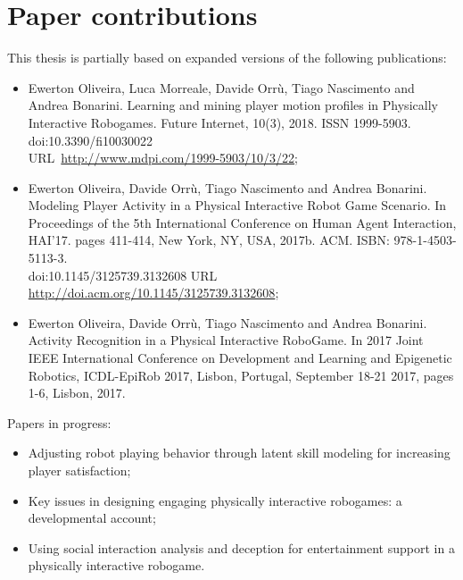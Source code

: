 \section{Paper contributions}

This thesis is partially based on expanded versions of the following publications:

\begin{itemize}
    \item Ewerton Oliveira, Luca Morreale, Davide Orrù, Tiago Nascimento and Andrea Bonarini. Learning and mining player motion profiles in Physically Interactive Robogames. Future Internet, 10(3), 2018. ISSN 1999-5903. doi:10.3390/fi10030022\\ URL~\url{http://www.mdpi.com/1999-5903/10/3/22};
    \item Ewerton Oliveira, Davide Orrù, Tiago Nascimento and Andrea Bonarini. Modeling Player Activity  in a Physical Interactive Robot Game Scenario. In Proceedings of the 5th International Conference on Human Agent Interaction, HAI'17. pages 411-414, New York, NY, USA, 2017b. ACM. ISBN: 978-1-4503-5113-3. \\
    doi:10.1145/3125739.3132608 URL \url{http://doi.acm.org/10.1145/3125739.3132608};
    \item Ewerton Oliveira, Davide Orrù, Tiago Nascimento and Andrea Bonarini. Activity Recognition in a Physical Interactive RoboGame. In 2017 Joint IEEE International Conference on Development and Learning and Epigenetic Robotics, ICDL-EpiRob 2017, Lisbon, Portugal, September 18-21 2017, pages 1-6, Lisbon, 2017.
\end{itemize}

Papers in progress:

\begin{itemize}
\item Adjusting robot playing behavior through latent skill modeling for increasing player satisfaction;
\item Key issues in designing engaging physically interactive robogames: a developmental account;
\item Using social interaction analysis and deception for entertainment support in a physically interactive robogame.
\end{itemize}